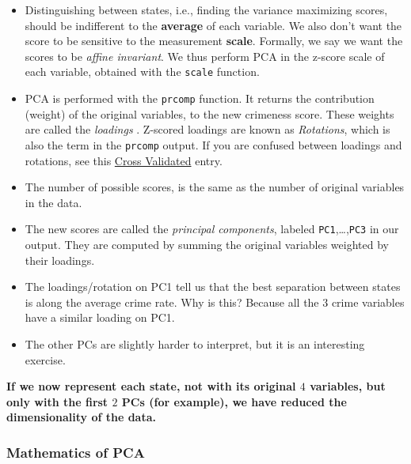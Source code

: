 \documentclass[]{book}
\theoremstyle{definition}
\theoremstyle{definition}
\theoremstyle{definition}
\theoremstyle{remark}
\begin{document}
\begin{itemize}
\item
  Distinguishing between states, i.e., finding the variance maximizing
  scores, should be indifferent to the \textbf{average} of each
  variable. We also don't want the score to be sensitive to the
  measurement \textbf{scale}. Formally, we say we want the scores to be
  \emph{affine invariant}. We thus perform PCA in the z-score scale of
  each variable, obtained with the \texttt{scale} function.
\item
  PCA is performed with the \texttt{prcomp} function. It returns the
  contribution (weight) of the original variables, to the new crimeness
  score. These weights are called the \emph{loadings} . Z-scored
  loadings are known as \emph{Rotations}, which is also the term in the
  \texttt{prcomp} output. If you are confused between loadings and
  rotations, see this
  \href{https://stats.stackexchange.com/questions/143905/loadings-vs-eigenvectors-in-pca-when-to-use-one-or-another}{Cross
  Validated} entry.
\item
  The number of possible scores, is the same as the number of original
  variables in the data.
\item
  The new scores are called the \emph{principal components}, labeled
  \texttt{PC1},\ldots{},\texttt{PC3} in our output. They are computed by
  summing the original variables weighted by their loadings.
\item
  The loadings/rotation on PC1 tell us that the best separation between
  states is along the average crime rate. Why is this? Because all the
  \(3\) crime variables have a similar loading on PC1.
\item
  The other PCs are slightly harder to interpret, but it is an
  interesting exercise.
\end{itemize}

\textbf{If we now represent each state, not with its original \(4\)
variables, but only with the first \(2\) PCs (for example), we have
reduced the dimensionality of the data.}

\subsubsection{Mathematics of PCA}\label{mathematics-of-pca}
\end{document}
